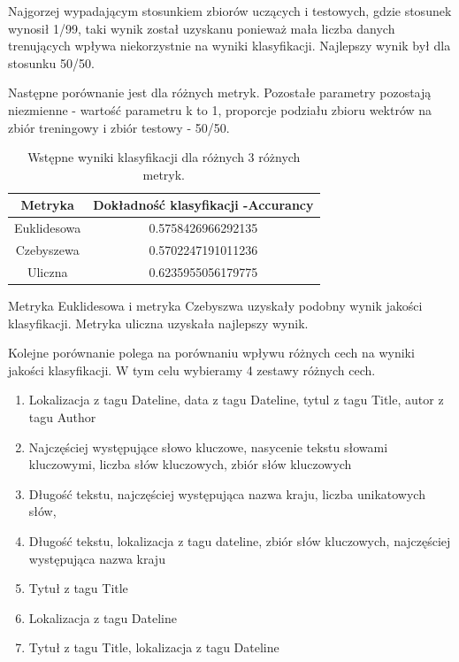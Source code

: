 \documentclass{classrep}
\begin{document}
Najgorzej wypadającym stosunkiem zbiorów uczących i testowych, gdzie stosunek wynosił 1/99, taki wynik został uzyskanu ponieważ mała liczba danych trenujących wpływa niekorzystnie na wyniki klasyfikacji. Najlepszy wynik był dla stosunku 50/50. 

Następne porównanie jest dla różnych metryk. Pozostałe parametry pozostają niezmienne - wartość parametru k to 1, proporcje podziału zbioru wektrów na zbiór treningowy i zbiór testowy - 50/50. 

\begin{table}[h!]
 \caption{Wstępne wyniki klasyfikacji dla różnych 3 różnych metryk.}
 \centering
 \vspace{0.1cm}
 \begin{tabular}{c c}
  \textbf{Metryka} & \textbf{Dokładność klasyfikacji -Accurancy}\\
\hline
  Euklidesowa &0.5758426966292135\\
  Czebyszewa & 0.5702247191011236\\
  Uliczna & 0.6235955056179775\\
 \end{tabular}
 \label{wyniki klasyfikacji dla roznych 10 wartosci parametru k}
\end{table}

Metryka Euklidesowa i metryka Czebyszwa uzyskały podobny wynik jakości klasyfikacji. Metryka uliczna uzyskała najlepszy wynik. 

Kolejne porównanie polega na porównaniu wpływu różnych cech na wyniki jakości klasyfikacji. W tym celu wybieramy 4 zestawy różnych cech. 
\begin{enumerate}
\item Lokalizacja z tagu Dateline, data z tagu Dateline, tytul z tagu Title, autor z tagu Author
\item Najczęściej występujące słowo kluczowe, nasycenie tekstu słowami kluczowymi, liczba słów kluczowych, zbiór słów kluczowych
\item Długość tekstu, najczęściej występująca nazwa kraju, liczba unikatowych słów, 
\item Długość tekstu, lokalizacja z tagu dateline, zbiór słów kluczowych, najczęściej występująca nazwa kraju
\item Tytuł z tagu Title
\item Lokalizacja z tagu Dateline
\item Tytuł z tagu Title, lokalizacja z tagu Dateline
\end{enumerate}
\end{document}
